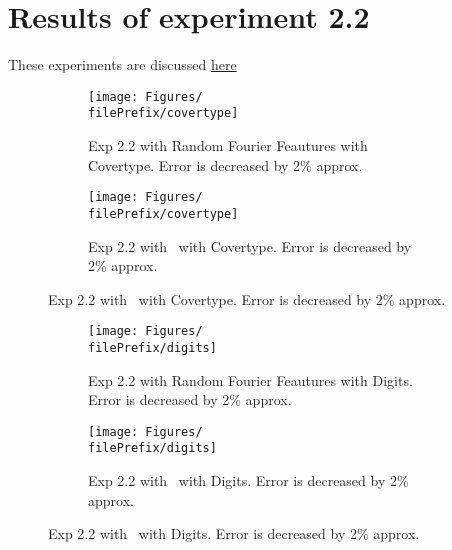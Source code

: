 
\newcommand{\major}{2}
\newcommand{\minor}{2}

\newcommand{\undPrefix}{\major_\minor}
\newcommand{\dotPrefix}{\major.\minor}
\newcommand{\scoPrefix}{\major-\minor}
\newcommand{\filePrefix}{\undPrefix/rff}

\chapter{Results of experiment \dotPrefix} %


\label{Appendix\scoPrefix} %
These experiments are discussed \hyperref[disc:h2]{here}



\begin{figure}[H]
  \centering
  \renewcommand{\filePrefix}{\undPrefix/rff}
  \begin{subfigure}[t]{0.5\linewidth}
    \centering\captionsetup{width=.8\linewidth}\texttt{[image: Figures/\\filePrefix/covertype]}
    \caption{Exp 2.2 with Random Fourier Feautures with Covertype. Error is decreased by 2\% approx.}
    \label{fig:\undPrefix_covertype}
  \end{subfigure}%
  \renewcommand{\filePrefix}{\undPrefix/nys}%
  \begin{subfigure}[t]{0.5\linewidth}
    \centering\captionsetup{width=.8\linewidth}\texttt{[image: Figures/\\filePrefix/covertype]}
    \caption{Exp 2.2 with \Nys\ with Covertype. Error is decreased by 2\% approx.}
    \label{fig:\undPrefix_covertype}
  \end{subfigure}%
\end{figure}

\begin{figure}[H]
  \centering
  \renewcommand{\filePrefix}{\undPrefix/rff}
  \begin{subfigure}[t]{0.5\linewidth}
    \centering\captionsetup{width=.8\linewidth}\texttt{[image: Figures/\\filePrefix/digits]}
    \caption{Exp 2.2 with Random Fourier Feautures with Digits. Error is decreased by 2\% approx.}
    \label{fig:\undPrefix_digits}
  \end{subfigure}%
  \renewcommand{\filePrefix}{\undPrefix/nys}%
  \begin{subfigure}[t]{0.5\linewidth}
    \centering\captionsetup{width=.8\linewidth}\texttt{[image: Figures/\\filePrefix/digits]}
    \caption{Exp 2.2 with \Nys\ with Digits. Error is decreased by 2\% approx.}
    \label{fig:\undPrefix_digits}
  \end{subfigure}
\end{figure}


